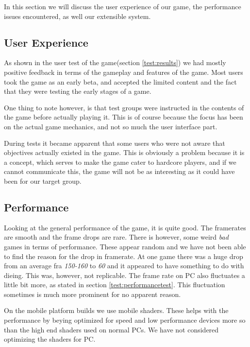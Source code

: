 In this section we will discuss the user experience of our game, the performance issues encountered, as well our extensible system.

\subsection{User Experience}
As shown in the user test of the game(section \ref{test:results}) we had mostly positive feedback in terms of the gameplay and features of the game.
Most users took the game as an early beta, and accepted the limited content and the fact that they were testing the early stages of a game.

One thing to note however, is that test groups were instructed in the contents of the game before actually playing it.
This is of course because the focus has been on the actual game mechanics, and not so much the user interface part.

During tests it became apparent that some users who were not aware that objectives actually existed in the game.
This is obviously a problem because it is a concept, which serves to make the game cater to hardcore players, and if we cannot communicate this, the game will not be as interesting as it could have been for our target group.

\subsection{Performance}
Looking at the general performance of the game, it is quite good. 
The framerates are smooth and the frame drops are rare. 
There is however, some weird \emph{bad} games in terms of performance. 
These appear random and we have not been able to find the reason for the drop in framerate. 
At one game there was a huge drop from an average fra \emph{150-160}  to \emph{60} and it appeared to have something to do with dieing. This was, however, not replicable. The frame rate on PC also fluctuates a little bit more, as stated in section \ref{test:performancetest}. This fluctuation sometimes is much more prominent for no apparent reason.

On the mobile platform builds we use mobile shaders. These helps with the performance by beying optimized for speed and low performance devices more so than the high end shaders used on normal PCs. We have not considered optimizing the shaders for PC.

